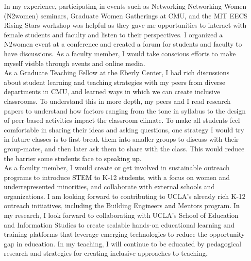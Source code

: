 \documentclass[10pt]{article}
\begin{document}
In my experience, participating in events such as Networking Networking Women (N2women) seminars, Graduate Women Gatherings at CMU, and the MIT EECS Rising Stars workshop was helpful as they gave me opportunities to interact with female students and faculty and listen to their perspectives. I organized a N2women event at a conference and created a forum for students and faculty to have discussions. 
As a  faculty member, I would take conscious efforts to make myself visible through events and online media.\\

As a Graduate Teaching Fellow at the Eberly Center, I had rich discussions about student learning and teaching strategies with my peers from diverse departments in CMU, and learned ways in which we can create inclusive classrooms. To understand this in more depth, my peers and I read research papers to understand how factors ranging from the tone in syllabus to the design of peer-based activities impact the classroom climate. To make all students feel comfortable in sharing their ideas and asking questions, one strategy I would try in future classes is to first break them into smaller groups to discuss with their group-mates, and then later ask them to share with the class. This would reduce the barrier some students face to speaking up.\\ 

As a faculty member, I would create or get involved in sustainable outreach programs to introduce STEM to K-12 students,  with a focus on women and underrepresented minorities, and collaborate with external schools and organizations.   I am looking forward to contributing to UCLA's already rich K-12 outreach initiatives, including the Building Engineers and Mentors program. 
In my research, I look forward to collaborating with UCLA's School of  Education and Information Studies to create scalable hands-on educational learning and training platforms that leverage emerging technologies to reduce the opportunity gap in education.  In my teaching, I will continue to be educated by pedagogical research and strategies for creating inclusive approaches to teaching.

\end{document}
